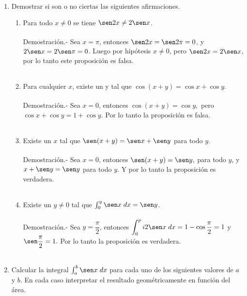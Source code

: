 \begin{enumerate}
\item Demostrar si son o no ciertas las siguientes afirmaciones.

    \begin{enumerate}[\bfseries (a)]

	\item Para todo $x\neq 0$ se tiene $\sen2x \neq 2\sen x$.\\\\
	    Demostración.-\; Sea $x=\pi$, entonces $\sen 2 x = \sen2\pi = 0$, y $2\sen x = 2\sen \pi = 0$. Luego por hipótesis $x\neq 0$,  pero $\sen2x = 2\sen x$, por lo tanto este proposición es falsa.\\\\

	\item Para cualquier $x$, existe un y tal que $\cos(x+y)=\cos x+\cos y$.\\\\
	    Demostración.-\; Sea $x=0$, entonces $\cos(x+y) = \cos y,$ pero $\cos x +\cos y = 1+\cos y.$ Por lo tanto la proposición es falsa.\\\\

	\item Existe un $x$ tal que $\sen(x+y)=\sen x + \sen y $ para todo $y$.\\\\
	    Demostración.-\; Sea $x=0$, entonces $\sen(x+y) = \sen y,$ para todo $y$, y $x+\sen y =\sen y$ para todo $y.$ Y por lo tanto la proposición es verdadera.\\\\

	\item Existe un $y\neq 0$ tal que $\int_0^y \sen x\; dx = \sen y$.\\\\
	    Demostración.-\; Sea $y=\dfrac{\pi}{2}$, entonces $\displaystyle\int_0^pi 2 \sen x \; dx = 1-\cos\dfrac{\pi}{2}=1$ y $\sen \dfrac{\pi}{2}=1.$ Por lo tanto la proposición es verdadera.\\\\

    \end{enumerate}

\item Calcular la integral $\int_a^b \sen x \; dx$ para cada uno de los siguientes valores de $a$ y $b$. En cada caso interpretar el resultado geométricamente en función del área.


\end{enumerate}
